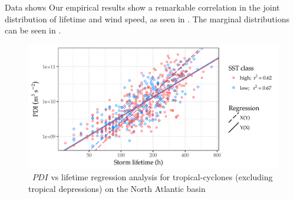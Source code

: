 
\begin{block}{Data shows}
	Our empirical results show a remarkable correlation in the joint distribution of lifetime and wind speed, as seen in . The marginal distributions can be seen in .

	\begin{figure}
		\includegraphics[width=0.84\linewidth]{images/scatter_natl.png}
		\caption{~$PDI$ vs lifetime regression analysis for tropical-cyclones (excluding tropical depressions) on the North Atlantic basin}
		\label{fig:regression}
	\end{figure}
\end{block}
